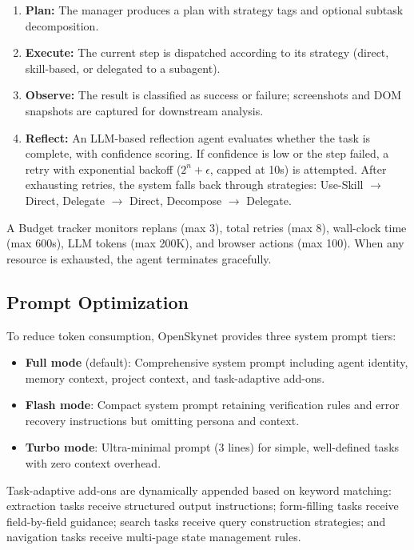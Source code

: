 \begin{enumerate}[leftmargin=*,itemsep=1pt]
    \item \textbf{Plan:} The manager produces a plan with strategy tags and optional subtask decomposition.
    \item \textbf{Execute:} The current step is dispatched according to its strategy (direct, skill-based, or delegated to a subagent).
    \item \textbf{Observe:} The result is classified as success or failure; screenshots and DOM snapshots are captured for downstream analysis.
    \item \textbf{Reflect:} An LLM-based reflection agent evaluates whether the task is complete, with confidence scoring. If confidence is low or the step failed, a retry with exponential backoff ($2^n + \epsilon$, capped at 10s) is attempted. After exhausting retries, the system falls back through strategies: Use-Skill $\rightarrow$ Direct, Delegate $\rightarrow$ Direct, Decompose $\rightarrow$ Delegate.
\end{enumerate}

A Budget tracker monitors replans (max 3), total retries (max 8), wall-clock time (max 600s), LLM tokens (max 200K), and browser actions (max 100). When any resource is exhausted, the agent terminates gracefully.

\subsection{Prompt Optimization}

To reduce token consumption, OpenSkynet provides three system prompt tiers:

\begin{itemize}[leftmargin=*,itemsep=1pt]
    \item \textbf{Full mode} (default): Comprehensive system prompt including agent identity, memory context, project context, and task-adaptive add-ons.
    \item \textbf{Flash mode}: Compact system prompt retaining verification rules and error recovery instructions but omitting persona and context.
    \item \textbf{Turbo mode}: Ultra-minimal prompt (3 lines) for simple, well-defined tasks with zero context overhead.
\end{itemize}

Task-adaptive add-ons are dynamically appended based on keyword matching: extraction tasks receive structured output instructions; form-filling tasks receive field-by-field guidance; search tasks receive query construction strategies; and navigation tasks receive multi-page state management rules.


